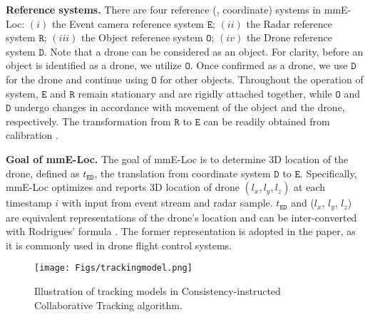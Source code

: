 \textbf{Reference systems.} \label{3.2}
There are four reference (\aka, coordinate) systems in mmE-Loc: 
$(i)$ the Event camera reference system $\mathtt{E}$; 
$(ii)$ the Radar reference system $\mathtt{R}$; 
$(iii)$ the Object reference system $\mathtt{O}$;
$(iv)$ the Drone reference system $\mathtt{D}$.
Note that a drone can be considered as an object.
For clarity, before an object is identified as a drone, we utilize $\mathtt{O}$. 
Once confirmed as a drone, we use $\mathtt{D}$ for the drone and continue using $\mathtt{O}$ for other objects.
Throughout the operation of system, $\mathtt{E}$ and $\mathtt{R}$ remain stationary and are rigidly attached together, while $\mathtt{O}$ and $\mathtt{D}$ undergo changes in accordance with movement of the object and the drone, respectively. 
The transformation from $\mathtt{R}$ to $\mathtt{E}$ can be readily obtained from calibration \cite{wang2023vital}. 

\textbf{Goal of mmE-Loc.}
The goal of mmE-Loc is to determine 3D location of the drone, defined as $t_{\mathtt{ED}}$, the translation from coordinate system $\mathtt{D}$ to $\mathtt{E}$.
Specifically, mmE-Loc optimizes and reports 3D location of drone $(l_x, l_y, l_z)$ at each timestamp $i$ with input from event stream and radar sample.
$t_{\mathtt{ED}}$ and ($l_x$, $l_y$, $l_z$) are equivalent representations of the drone’s location and can be inter-converted with Rodrigues’ formula \cite{min2021joint}. 
The former representation is adopted in the paper, as it is commonly used in drone flight control systems.

\begin{figure*}[t]
    \setlength{\abovecaptionskip}{0.3cm} %
    \setlength{\belowcaptionskip}{-0.2cm}
    \setlength{\subfigcapskip}{-0.25cm}
    \centering
        \texttt{[image: Figs/trackingmodel.png]}
        \vspace{-0.3cm}
    \caption{Illustration of tracking models in Consistency-instructed Collaborative Tracking algorithm.}
    \label{CCT}
    \vspace{-0.2cm}
\end{figure*} 




